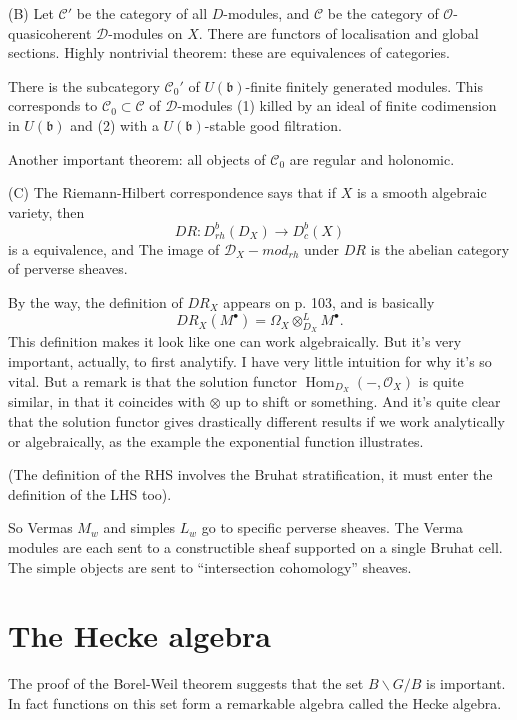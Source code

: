 \documentclass[12pt]{article}
\theoremstyle{plain}
\theoremstyle{definition}
\numberwithin{equation}{section}
\DeclareMathOperator{\Hom}{Hom}
\newcommand{\Om}{\Omega}
\newcommand{\frakb}{\mathfrak{b}}
\newcommand{\CC}{\mathcal{C}}
\newcommand{\CD}{\mathcal{D}}
\newcommand{\OO}{\mathcal{O}}
\begin{document}
(B) Let $\CC'$ be the category of all $D$-modules, and $\CC$ be the category of $\OO$-quasicoherent $\CD$-modules on $X$. There are functors of localisation and global sections. Highly nontrivial theorem: these are equivalences of categories.


There is the subcategory $\CC_0'$ of $U(\frakb)$-finite finitely generated modules. This corresponds to $\CC_0 \subset \CC$ of $\CD$-modules (1) killed by an ideal of finite codimension in $U(\frakb)$ and (2) with a $U(\frakb)$-stable good filtration.

Another important theorem: all objects of $\CC_0$ are regular and holonomic.

(C) The Riemann-Hilbert correspondence {\cite[Theorem 7.2.2]{HTT}} says that if $X$ is a smooth algebraic variety, then
\[
DR : D^b_{rh}(D_X) \rightarrow D^b_c(X)
\]
is a equivalence, and {\cite[Theorem 7.2.5]{HTT}} The image of $\CD_X-mod_{rh}$ under $DR$ is the abelian category of perverse sheaves.

By the way, the definition of $DR_X$ appears on p. 103, and is basically
\[
DR_X(M^\bullet) = \Om_X \otimes^L_{D_X} M^\bullet.
\]
This definition makes it look like one can work algebraically. But it's very important, actually, to first analytify. I have very little intuition for why it's so vital. But a remark is that the solution functor $\Hom_{D_X}(-, \OO_X)$ is quite similar, in that it coincides with $\otimes$ up to shift or something. And it's quite clear that the solution functor gives drastically different results if we work analytically or algebraically, as the example the exponential function illustrates.

(The definition of the RHS involves the Bruhat stratification, it must enter the definition of the LHS too).

So Vermas $M_w$ and simples $L_w$ go to specific perverse sheaves. The Verma modules are each sent to a constructible sheaf supported on a single Bruhat cell. The simple objects are sent to ``intersection cohomology'' sheaves.





\section{The Hecke algebra}


The proof of the Borel-Weil theorem suggests that the set $B \backslash G / B$ is important. In fact functions on this set form a remarkable algebra called the Hecke algebra.
\end{document}

